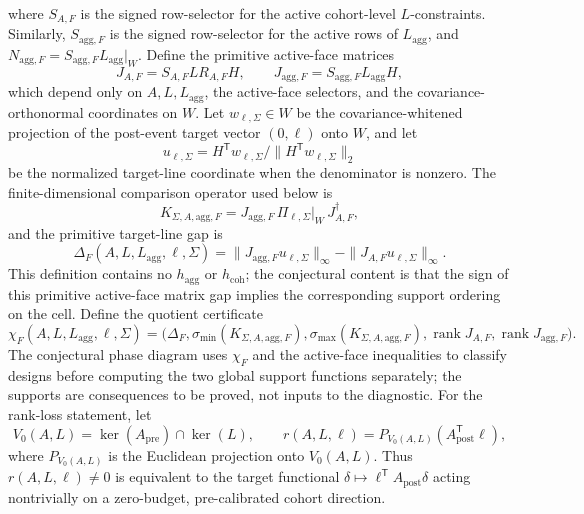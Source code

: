 \documentclass[11pt]{article}
\newcommand{\transpose}{\mathsf{T}}
\theoremstyle{definition}
\theoremstyle{plain}
\theoremstyle{remark}
\begin{document}
where \(S_{A,F}\) is the signed row-selector for the active cohort-level \(L\)-constraints.
Similarly, \(S_{\mathrm{agg},F}\) is the signed row-selector for the active rows of \(L_{\mathrm{agg}}\), and \(N_{\mathrm{agg},F}=S_{\mathrm{agg},F}L_{\mathrm{agg}}|_W\).
Define the primitive active-face matrices
\[
  J_{A,F}=S_{A,F}L R_{A,F}H,\qquad
  J_{\mathrm{agg},F}=S_{\mathrm{agg},F}L_{\mathrm{agg}}H,
\]
which depend only on \(A,L,L_{\mathrm{agg}}\), the active-face selectors, and the covariance-orthonormal coordinates on \(W\).
Let \(w_{\ell,\Sigma}\in W\) be the covariance-whitened projection of the post-event target vector \((0,\ell)\) onto \(W\), and let
\[
  u_{\ell,\Sigma}=H^\transpose w_{\ell,\Sigma}/\|H^\transpose w_{\ell,\Sigma}\|_2
\]
be the normalized target-line coordinate when the denominator is nonzero.
The finite-dimensional comparison operator used below is
\[
  K_{\Sigma,A,\mathrm{agg},F}
  =
  J_{\mathrm{agg},F}\,\Pi_{\ell,\Sigma}|_W\,J_{A,F}^{\dagger},
\]
and the primitive target-line gap is
\[
  \Delta_F(A,L,L_{\mathrm{agg}},\ell,\Sigma)
  =
  \|J_{\mathrm{agg},F}u_{\ell,\Sigma}\|_\infty
  -
  \|J_{A,F}u_{\ell,\Sigma}\|_\infty .
\]
This definition contains no \(h_{\mathrm{agg}}\) or \(h_{\mathrm{coh}}\); the conjectural content is that the sign of this primitive active-face matrix gap implies the corresponding support ordering on the cell.
Define the quotient certificate
\[
  \chi_F(A,L,L_{\mathrm{agg}},\ell,\Sigma)
  =
  \big(\Delta_F,
       \sigma_{\min}(K_{\Sigma,A,\mathrm{agg},F}),
       \sigma_{\max}(K_{\Sigma,A,\mathrm{agg},F}),
       \operatorname{rank} J_{A,F},
       \operatorname{rank} J_{\mathrm{agg},F}\big).
\]
The conjectural phase diagram uses \(\chi_F\) and the active-face inequalities to classify designs before computing the two global support functions separately; the supports are consequences to be proved, not inputs to the diagnostic.
For the rank-loss statement, let
\[
  V_0(A,L)=\ker(A_{\mathrm{pre}})\cap\ker(L),
  \qquad
  r(A,L,\ell)=P_{V_0(A,L)}(A_{\mathrm{post}}^\transpose\ell),
\]
where \(P_{V_0(A,L)}\) is the Euclidean projection onto \(V_0(A,L)\).
Thus \(r(A,L,\ell)\ne0\) is equivalent to the target functional \(\delta\mapsto\ell^\transpose A_{\mathrm{post}}\delta\) acting nontrivially on a zero-budget, pre-calibrated cohort direction.
\end{document}
